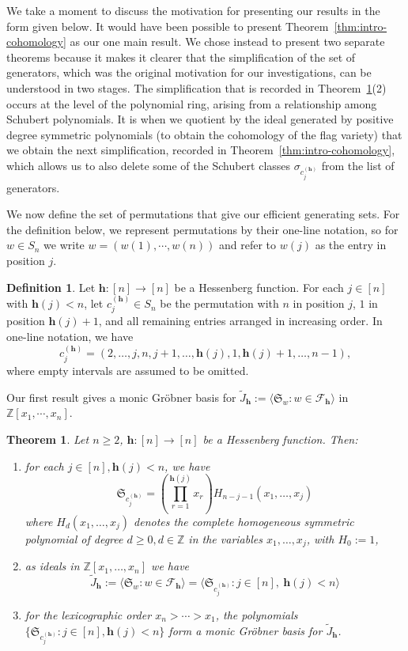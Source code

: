 \documentclass[11pt]{amsart}
\theoremstyle{plain}
\newtheorem{introtheorem}{Theorem}
\theoremstyle{definition}
\newtheorem{defi}[thm]{Definition}
\newcommand{\hess}{{\mathbf h}}
\newcommand{\Z}{\mathbb{ Z}}           %
\numberwithin{equation}{section}
\begin{document}
We take a moment to discuss the motivation for presenting our results in the form given below. It would have been possible to present Theorem~\ref{thm:intro-cohomology} as our one main result. We chose instead to present two separate theorems because it makes it clearer that the simplification of the set of generators, which was the original motivation for our investigations, can be understood in two stages. The simplification that is recorded in Theorem~\ref{thm:intro-polynomial}(2) occurs at the level of the polynomial ring, arising from a relationship among Schubert polynomials. It is when we quotient by the ideal generated by positive degree symmetric polynomials (to obtain the cohomology of the flag variety) that we obtain the next simplification, recorded in Theorem~\ref{thm:intro-cohomology}, which allows us to also delete some of the Schubert classes $\sigma_{c_j^{(\hess)}}$ from the list of generators. 

We now define the set of permutations that give our efficient generating sets. 
For the definition below, we represent permutations by their one-line notation, so for $w \in S_n$ we write $w = (w(1),\cdots,w(n))$ and refer to $w(j)$ as the entry in position $j$. 

\begin{defi}\label{def:gens}
Let $\hess:[n]\to[n]$ be a Hessenberg function. For each $j\in[n]$
with $\hess(j)<n$, let $c_j^{(\hess)}\in S_n$ be the permutation with $n$ in
position $j$, $1$ in position $\hess(j)+1$, and all remaining entries arranged 
in increasing order. In one-line notation, we have
\[
c_j^{(\hess)}=(2,\ldots,j,n,j+1,\ldots,\hess(j),1,\hess(j)+1,\ldots,n-1),
\]
where empty intervals are assumed to be omitted.
\end{defi}

 Our first result gives a monic Gr\"obner basis for $\tilde{J}_\hess:= \langle \mathfrak{S}_w: w \in \mathcal{F}_\hess\rangle$ in $\Z[x_1,\cdots,x_n]$. 

\begin{introtheorem}\label{thm:intro-polynomial}
Let $n\geq 2$, $\hess:[n]\to[n]$ be a Hessenberg function.   
Then: 
\begin{enumerate} 
\item for each $j \in [n], \hess(j)<n$, we have 
\[
\mathfrak{S}_{c_j^{(\hess)}}
=
\left(\prod_{r=1}^{\hess(j)}x_r\right)
H_{n-j-1}(x_1,\ldots,x_j)
\]
where $H_d(x_1,\ldots,x_j)$ denotes the complete homogeneous
symmetric polynomial of degree $d\geq 0, d\in \Z$ in the variables $x_1,\ldots,x_j$,
with $H_0 :=1$, 
\item as ideals in $\mathbb{Z}[x_1,\ldots,x_n]$ we have 
\[
\tilde{J}_\hess := \bigl\langle \mathfrak{S}_w : w\in\mathcal{F}_\hess \bigr\rangle
=
\bigl\langle \mathfrak{S}_{c_j^{(\hess)}} : j\in[n],\ \hess(j)<n \bigr\rangle
\]
\item for the lexicographic order $x_n>\cdots>x_1$, the polynomials $\{\mathfrak{S}_{c_j^{(\hess)}}: j \in [n], \hess(j)<n\}$  
form a monic Gr\"obner basis for $\tilde{J}_\hess$. 
\end{enumerate}  
\end{introtheorem}
\end{document}
